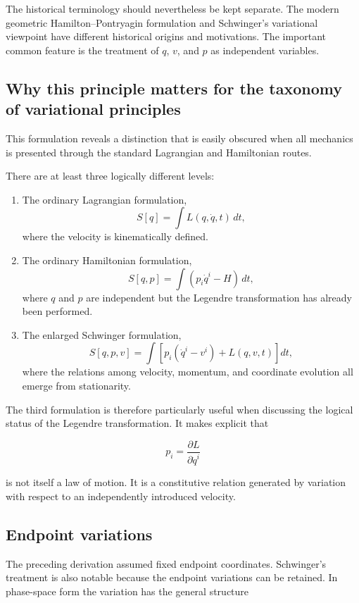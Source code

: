 The historical terminology should nevertheless be kept separate. The modern geometric Hamilton--Pontryagin formulation and Schwinger's variational viewpoint have different historical origins and motivations. The important common feature is the treatment of \(q\), \(v\), and \(p\) as independent variables.

\subsection{Why this principle matters for the taxonomy of variational principles}

This formulation reveals a distinction that is easily obscured when all mechanics is presented through the standard Lagrangian and Hamiltonian routes.

There are at least three logically different levels:

\begin{enumerate}
\item The ordinary Lagrangian formulation,
\[
S[q]=\int L(q,\dot q,t)\,dt,
\]
where the velocity is kinematically defined.
\item The ordinary Hamiltonian formulation,
$$S[q,p]=\int(p_i\dot q^i-H)\,dt,$$
where \(q\) and \(p\) are independent but the Legendre transformation has already been performed.
\item The enlarged Schwinger formulation,
$$S[q,p,v]=\int\left[p_i(\dot q^i-v^i)+L(q,v,t)\right]dt,$$
where the relations among velocity, momentum, and coordinate evolution all emerge from stationarity.
\end{enumerate}

The third formulation is therefore particularly useful when discussing the logical status of the Legendre transformation. It makes explicit that

$$p_i=\frac{\partial L}{\partial\dot q^i}$$

is not itself a law of motion. It is a constitutive relation generated by variation with respect to an independently introduced velocity.

\subsection{Endpoint variations}

The preceding derivation assumed fixed endpoint coordinates. Schwinger's treatment is also notable because the endpoint variations can be retained. In phase-space form the variation has the general structure

